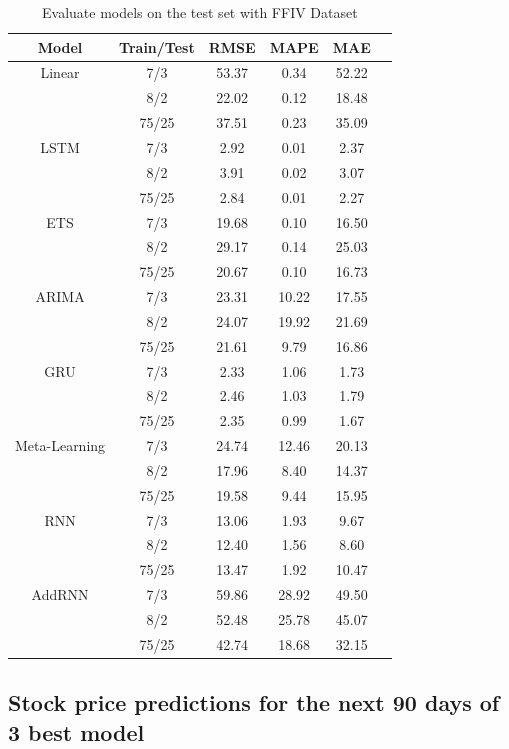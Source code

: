 \documentclass{ieeeojies}
\begin{document}
\begin{table}[h!]
\centering
\begin{tabular}{cccccc}
\toprule
\textbf{Model} & \textbf{Train/Test} & \textbf{RMSE} & \textbf{MAPE} & \textbf{MAE} \\ 
\midrule
Linear & 7/3 & 53.37 & 0.34 & 52.22 \\ 
       & 8/2 & 22.02 & 0.12 & 18.48 \\ 
       & 75/25 & 37.51 & 0.23 & 35.09 \\ 
\midrule
LSTM   & 7/3 & 2.92 & 0.01 & 2.37 \\ 
       & 8/2 & 3.91 & 0.02 & 3.07 \\ 
       & 75/25 & 2.84 & 0.01 & 2.27 \\ 
\midrule
ETS    & 7/3 & 19.68 & 0.10 & 16.50 \\ 
       & 8/2 & 29.17 & 0.14 & 25.03 \\ 
       & 75/25 & 20.67 & 0.10 & 16.73 \\ 
\midrule
ARIMA  & 7/3 & 23.31 & 10.22 & 17.55 \\ 
       & 8/2 & 24.07 & 19.92 & 21.69 \\ 
       & 75/25 & 21.61 & 9.79 & 16.86 \\ 
\midrule
GRU    & 7/3 & 2.33 & 1.06 & 1.73 \\ 
       & 8/2 & 2.46 & 1.03 & 1.79 \\ 
       & 75/25 & 2.35 & 0.99 & 1.67 \\ 
\midrule
Meta-Learning & 7/3 & 24.74 & 12.46 & 20.13 \\ 
              & 8/2 & 17.96 & 8.40 & 14.37 \\ 
              & 75/25 & 19.58 & 9.44 & 15.95 \\ 
\midrule
RNN    & 7/3 & 13.06 & 1.93 & 9.67 \\ 
       & 8/2 & 12.40 & 1.56 & 8.60 \\ 
       & 75/25 & 13.47 & 1.92 & 10.47 \\ 
\midrule
AddRNN & 7/3 & 59.86 & 28.92 & 49.50 \\ 
       & 8/2 & 52.48 & 25.78 & 45.07 \\ 
       & 75/25 & 42.74 & 18.68 & 32.15 \\ 
\bottomrule
\end{tabular}
\caption{Evaluate models on the test set with FFIV Dataset}
\label{table:performance_metrics_ffiv}
\end{table}
\vspace{-20pt}
\subsection{Stock price predictions for the next 90 days of 3 best model}
\end{document}
